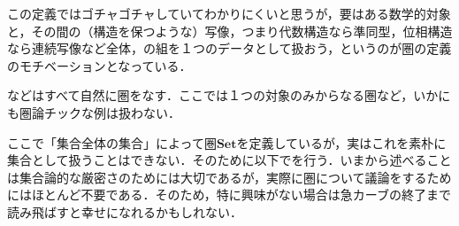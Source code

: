 この定義ではゴチャゴチャしていてわかりにくいと思うが，要はある数学的対象と，その間の（構造を保つような）写像，つまり代数構造なら準同型，位相構造なら連続写像など全体，の組を１つのデータとして扱おう，というのが圏の定義のモチベーションとなっている．

\begin{ex}	
	などはすべて自然に圏をなす．ここでは１つの対象のみからなる圏など，いかにも圏論チックな例は扱わない．
\end{ex}

ここで「集合全体の集合」によって圏$\mathbf{Set}$を定義しているが，実はこれを素朴に集合として扱うことはできない．そのために以下でを行う．いまから述べることは集合論的な厳密さのためには大切であるが，実際に圏について議論をするためにはほとんど不要である．そのため，特に興味がない場合は急カーブの終了まで読み飛ばすと幸せになれるかもしれない．

